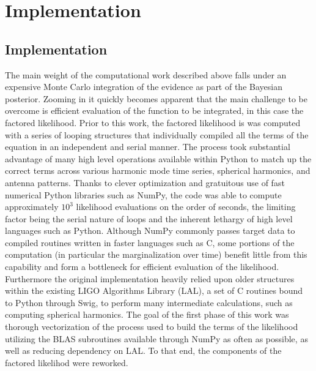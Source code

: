 \chapter{Implementation}



\section{Implementation}
The main weight of the computational work described above falls under an expensive Monte Carlo integration of the evidence as part of the Bayesian posterior. Zooming in it quickly becomes apparent that the main challenge to be overcome is efficient evaluation of the function to be integrated, in this case the factored likelihood. Prior to this work, the factored likelihood is was computed with a series of looping structures that individually compiled all the terms of the equation in an independent and serial manner. The process took substantial advantage of many high level operations available within Python to match up the correct terms across various harmonic mode time series, spherical harmonics, and antenna patterns. Thanks to clever optimization and gratuitous use of fast numerical Python libraries such as NumPy, the code was able to compute approximately $10^3$ likelihood evaluations on the order of seconds, the limiting factor being the serial nature of loops and the inherent lethargy of high level languages such as Python. Although NumPy commonly passes target data to compiled routines written in faster languages such as C, some portions of the computation (in particular the marginalization over time) benefit little from this capability and form a bottleneck for efficient evaluation of the likelihood. Furthermore the original implementation heavily relied upon older structures within the existing LIGO Algorithms Library (LAL), a set of C routines bound to Python through Swig, to perform many intermediate calculations, such as computing spherical harmonics. The goal of the first phase of this work was thorough vectorization of the process used to build the terms of the likelihood utilizing the BLAS subroutines available through NumPy as often as possible, as well as reducing dependency on LAL. To that end, the components of the factored likelihod were reworked. 

